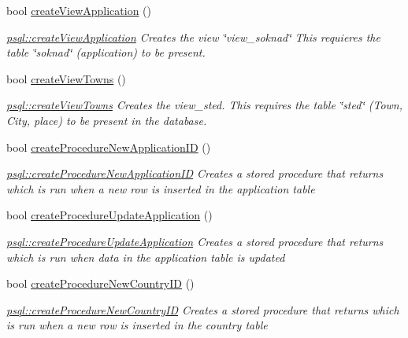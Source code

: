\begin{DoxyCompactItemize}
bool \mbox{\hyperlink{classpsql_ad6fb8e1e7177c7996f297d477ecceb27}{create\+View\+Application}} ()
\begin{DoxyCompactList}\small\item\em \mbox{\hyperlink{classpsql_ad6fb8e1e7177c7996f297d477ecceb27}{psql\+::create\+View\+Application}} Creates the view \char`\"{}view\+\_\+soknad\char`\"{} This requieres the table \char`\"{}soknad\char`\"{} (application) to be present. \end{DoxyCompactList}\item 
bool \mbox{\hyperlink{classpsql_ac5b1230ac405a600b67b144060b33a0d}{create\+View\+Towns}} ()
\begin{DoxyCompactList}\small\item\em \mbox{\hyperlink{classpsql_ac5b1230ac405a600b67b144060b33a0d}{psql\+::create\+View\+Towns}} Creates the view\+\_\+sted. This requires the table \char`\"{}sted\char`\"{} (Town, City, place) to be present in the database. \end{DoxyCompactList}\item 
bool \mbox{\hyperlink{classpsql_ae9e3ee06f4a5ecd4178662dfa0655fe1}{create\+Procedure\+New\+Application\+ID}} ()
\begin{DoxyCompactList}\small\item\em \mbox{\hyperlink{classpsql_ae9e3ee06f4a5ecd4178662dfa0655fe1}{psql\+::create\+Procedure\+New\+Application\+ID}} Creates a stored procedure that returns which is run when a new row is inserted in the application table \end{DoxyCompactList}\item 
bool \mbox{\hyperlink{classpsql_a28f3e3d6309e3ce57493db284c099946}{create\+Procedure\+Update\+Application}} ()
\begin{DoxyCompactList}\small\item\em \mbox{\hyperlink{classpsql_a28f3e3d6309e3ce57493db284c099946}{psql\+::create\+Procedure\+Update\+Application}} Creates a stored procedure that returns which is run when data in the application table is updated \end{DoxyCompactList}\item 
bool \mbox{\hyperlink{classpsql_a565bfc828ecb6b5621354128773494fd}{create\+Procedure\+New\+Country\+ID}} ()
\begin{DoxyCompactList}\small\item\em \mbox{\hyperlink{classpsql_a565bfc828ecb6b5621354128773494fd}{psql\+::create\+Procedure\+New\+Country\+ID}} Creates a stored procedure that returns which is run when a new row is inserted in the country table \end{DoxyCompactList}\item 

\end{DoxyCompactItemize}
